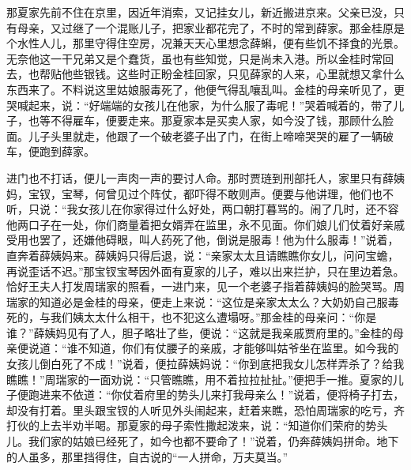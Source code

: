 \begin{parag}
    那夏家先前不住在京里，因近年消索，又记挂女儿，新近搬进京来。父亲已没，只有母亲，又过继了一个混账儿子，把家业都花完了，不时的常到薛家。那金桂原是个水性人儿，那里守得住空房，况兼天天心里想念薛蝌，便有些饥不择食的光景。无奈他这一干兄弟又是个蠢货，虽也有些知觉，只是尚未入港。所以金桂时常回去，也帮贴他些银钱。这些时正盼金桂回家，只见薛家的人来，心里就想又拿什么东西来了。不料说这里姑娘服毒死了，他便气得乱嚷乱叫。金桂的母亲听见了，更哭喊起来，说：“好端端的女孩儿在他家，为什么服了毒呢！”哭着喊着的，带了儿子，也等不得雇车，便要走来。那夏家本是买卖人家，如今没了钱，那顾什么脸面。儿子头里就走，他跟了一个破老婆子出了门，在街上啼啼哭哭的雇了一辆破车，便跑到薛家。
\end{parag}


\begin{parag}
    进门也不打话，便儿一声肉一声的要讨人命。那时贾琏到刑部托人，家里只有薛姨妈，宝钗，宝琴，何曾见过个阵仗，都吓得不敢则声。便要与他讲理，他们也不听，只说：“我女孩儿在你家得过什么好处，两口朝打暮骂的。闹了几时，还不容他两口子在一处，你们商量着把女婿弄在监里，永不见面。你们娘儿们仗着好亲戚受用也罢了，还嫌他碍眼，叫人药死了他，倒说是服毒！他为什么服毒！”说着，直奔着薛姨妈来。薛姨妈只得后退，说：“亲家太太且请瞧瞧你女儿，问问宝蟾，再说歪话不迟。”那宝钗宝琴因外面有夏家的儿子，难以出来拦护，只在里边着急。恰好王夫人打发周瑞家的照看，一进门来，见一个老婆子指着薛姨妈的脸哭骂。周瑞家的知道必是金桂的母亲，便走上来说：“这位是亲家太太么？大奶奶自己服毒死的，与我们姨太太什么相干，也不犯这么遭塌呀。”那金桂的母亲问：“你是谁？”薛姨妈见有了人，胆子略壮了些，便说：“这就是我亲戚贾府里的。”金桂的母亲便说道：“谁不知道，你们有仗腰子的亲戚，才能够叫姑爷坐在监里。如今我的女孩儿倒白死了不成！”说着，便拉薛姨妈说：“你到底把我女儿怎样弄杀了？给我瞧瞧！”周瑞家的一面劝说：“只管瞧瞧，用不着拉拉扯扯。”便把手一推。夏家的儿子便跑进来不依道：“你仗着府里的势头儿来打我母亲么！”说着，便将椅子打去，却没有打着。里头跟宝钗的人听见外头闹起来，赶着来瞧，恐怕周瑞家的吃亏，齐打伙的上去半劝半喝。那夏家的母子索性撒起泼来，说：“知道你们荣府的势头儿。我们家的姑娘已经死了，如今也都不要命了！”说着，仍奔薛姨妈拼命。地下的人虽多，那里挡得住，自古说的“一人拼命，万夫莫当。”
\end{parag}


